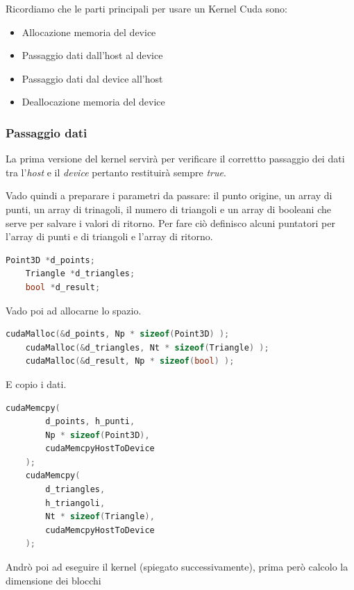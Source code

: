 \documentclass[a4paper]{article}
\begin{document}
Ricordiamo che le parti principali per usare un Kernel Cuda sono:
\begin{itemize}
    \item Allocazione memoria del device
    \item Passaggio dati dall'host al device
    \item Passaggio dati dal device all'host
    \item Deallocazione memoria del device
\end{itemize}

\subsubsection{Passaggio dati}

La prima versione del kernel servirà per verificare il correttto passaggio dei dati tra l'\emph{host} e il \emph{device} pertanto restituirà sempre \emph{true}.

Vado quindi a preparare i parametri da passare: il punto origine, un array di punti, un array di trinagoli, il numero di triangoli e un array di booleani che serve per salvare i valori di ritorno. Per fare ciò definisco alcuni puntatori per l'array di punti e di triangoli e l'array di ritorno.

\begin{lstlisting}[language=c++]
    Point3D *d_points;
    Triangle *d_triangles;
    bool *d_result;
\end{lstlisting}

Vado poi ad allocarne lo spazio.

\begin{lstlisting}[language=c++]
    cudaMalloc(&d_points, Np * sizeof(Point3D) );
    cudaMalloc(&d_triangles, Nt * sizeof(Triangle) );
    cudaMalloc(&d_result, Np * sizeof(bool) );
\end{lstlisting}

E copio i dati.

\begin{lstlisting}[language=c++]
    cudaMemcpy( 
        d_points, h_punti, 
        Np * sizeof(Point3D), 
        cudaMemcpyHostToDevice
    );
    cudaMemcpy( 
        d_triangles, 
        h_triangoli, 
        Nt * sizeof(Triangle), 
        cudaMemcpyHostToDevice
    );
\end{lstlisting}

\newpage

Andrò poi ad eseguire il kernel (spiegato successivamente), prima però calcolo la dimensione dei blocchi
\end{document}
